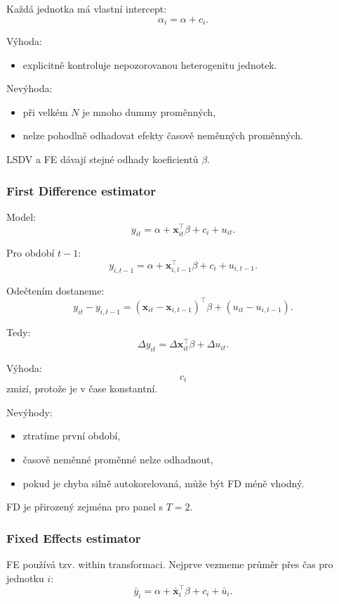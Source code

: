 Každá jednotka má vlastní intercept:
\[
    \alpha_i=\alpha+c_i.
\]

Výhoda:
\begin{itemize}
    \item explicitně kontroluje nepozorovanou heterogenitu jednotek.
\end{itemize}

Nevýhoda:
\begin{itemize}
    \item při velkém $N$ je mnoho dummy proměnných,
    \item nelze pohodlně odhadovat efekty časově neměnných proměnných.
\end{itemize}

LSDV a FE dávají stejné odhady koeficientů $\beta$.

\subsubsection{First Difference estimator}

Model:
\[
    y_{it}
    =
    \alpha
    +
    \mathbf x_{it}^\top\beta
    +
    c_i
    +
    u_{it}.
\]

Pro období $t-1$:
\[
    y_{i,t-1}
    =
    \alpha
    +
    \mathbf x_{i,t-1}^\top\beta
    +
    c_i
    +
    u_{i,t-1}.
\]

Odečtením dostaneme:
\[
    y_{it}-y_{i,t-1}
    =
    (\mathbf x_{it}-\mathbf x_{i,t-1})^\top\beta
    +
    (u_{it}-u_{i,t-1}).
\]

Tedy:
\[
    \Delta y_{it}
    =
    \Delta \mathbf x_{it}^\top\beta
    +
    \Delta u_{it}.
\]

Výhoda:
\[
    c_i
\]
zmizí, protože je v čase konstantní.

Nevýhody:
\begin{itemize}
    \item ztratíme první období,
    \item časově neměnné proměnné nelze odhadnout,
    \item pokud je chyba silně autokorelovaná, může být FD méně vhodný.
\end{itemize}

FD je přirozený zejména pro panel s $T=2$.

\subsubsection{Fixed Effects estimator}

FE používá tzv. within transformaci. Nejprve vezmeme průměr přes čas pro jednotku $i$:
\[
    \bar y_i
    =
    \alpha
    +
    \bar{\mathbf x}_i^\top\beta
    +
    c_i
    +
    \bar u_i.
\]


